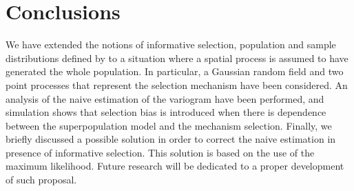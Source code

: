 \section{Conclusions} \label{sec:conclusions}
We have extended the notions of informative selection, population and sample distributions defined by \cite{pfefferman_1992} to a situation where a spatial process is assumed to have generated the whole population. In particular, a Gaussian random field and two point processes that represent the selection mechanism have been considered. An analysis of the naive estimation of the variogram have been performed, and simulation shows that selection bias is introduced when there is dependence between the superpopulation model and the mechanism selection. Finally, we briefly discussed a possible solution in order to correct the naive estimation in presence of informative selection. This solution is based on the use of the maximum likelihood. Future research will be dedicated to a proper development of such proposal.

